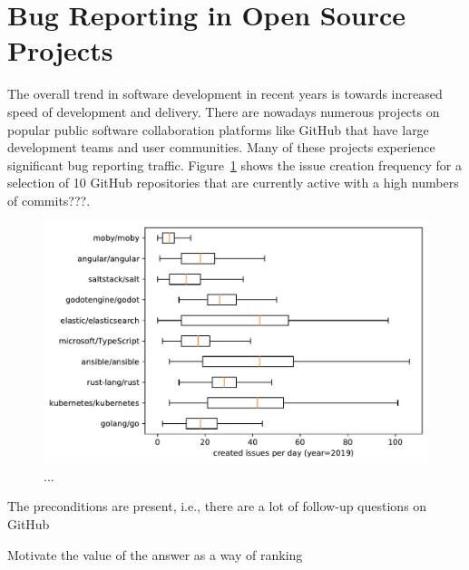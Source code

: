 \section{Bug Reporting in Open Source Projects}


The overall trend in software development in recent years is towards increased
speed of development and delivery. There are nowadays numerous projects on popular
public software collaboration platforms like GitHub that have large development
teams and user communities. Many of these projects experience significant
bug reporting traffic. Figure~\ref{fig:repo_activity} shows the issue creation
frequency for a selection of 10 GitHub repositories that are currently active
with a high numbers of commits???.

\begin{figure}[t]
\centering
\includegraphics[width=0.99\linewidth]{figures/popular_repos.pdf}
\caption{...}
\label{fig:repo_activity}
\end{figure}



The preconditions are present, i.e., there are a lot of follow-up questions on GitHub






Motivate the value of the answer as a way of ranking
